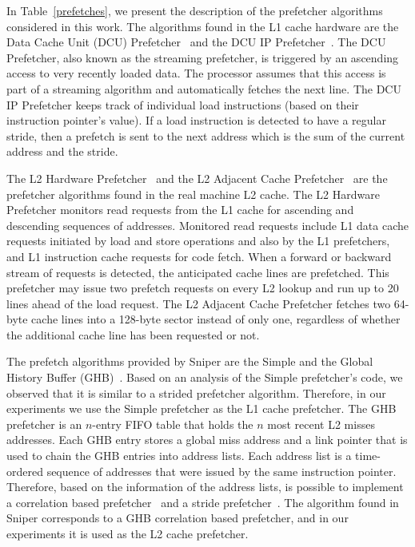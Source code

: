 \documentclass[AMA,final,STIX1COL]{WileyNJD-v2}
\newcommand{\ms}[1]{\textcolor{orange}{\bfseries \ul{ msserpa: #1} }\vspace{0.2cm}}
\newcommand{\vsg}[1]{\textcolor{blue}{\bfseries \ul{vsgirelli: #1} }\vspace{0.2cm}}
\begin{document}

In Table~\ref{prefetches}, we present the description of the prefetcher algorithms considered in this work. 
The algorithms found in the L1 cache hardware are the Data Cache Unit (DCU) Prefetcher~\cite{intelmanual} and the DCU IP Prefetcher~\cite{intelmanual}.
The DCU Prefetcher, also known as the streaming prefetcher, is triggered by an ascending access to very recently loaded data. 
The processor assumes that this access is part of a streaming algorithm and automatically fetches the next line.
The DCU IP Prefetcher keeps track of individual load instructions (based on their instruction pointer's value). 
If a load instruction is detected to have a regular stride, then a prefetch is sent to the next address which is the sum of the current address and the stride.


The L2 Hardware Prefetcher~\cite{intelmanual} and the L2 Adjacent Cache Prefetcher~\cite{intelmanual} are the prefetcher algorithms found in the real machine L2 cache.
The L2 Hardware Prefetcher monitors read requests from the L1 cache for ascending and descending sequences of addresses. 
Monitored read requests include L1 data cache requests initiated by load and store operations and also by the L1 prefetchers, and L1 instruction cache requests for code fetch.
When a forward or backward stream of requests is detected, the anticipated cache lines are prefetched.
This prefetcher may issue two prefetch requests on every L2 lookup and run up to 20 lines ahead of the load request. 
The L2 Adjacent Cache Prefetcher fetches two 64-byte cache lines into a 128-byte sector instead of only one, regardless of whether the additional cache line has been requested or not.

The prefetch algorithms provided by Sniper are the Simple and the Global History Buffer (GHB)~\cite{nesbit2004data}.
Based on an analysis of the Simple prefetcher's code, we observed that it is similar to a strided prefetcher algorithm.
Therefore, in our experiments we use the Simple prefetcher as the L1 cache prefetcher.
The GHB prefetcher is an $n$-entry FIFO table that holds the $n$ most recent L2 misses addresses. 
Each GHB entry stores a global miss address and a link pointer that is used to chain the GHB entries into address lists. 
Each address list is a time-ordered sequence of addresses that were issued by the same instruction pointer.
Therefore, based on the information of the address lists, is possible to implement a correlation based prefetcher~\cite{charney1995GeneralizedCB} and a stride prefetcher~\cite{nesbit2004data}.
The algorithm found in Sniper corresponds to a GHB correlation based prefetcher, and in our experiments it is used as the L2 cache prefetcher.
\end{document}
